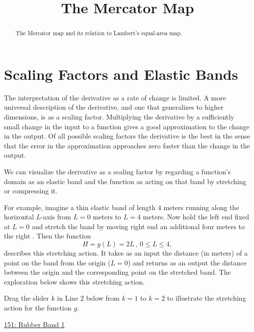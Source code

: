 \documentclass{ximera}
\title{The Mercator Map}
\begin{document}
\begin{abstract}
The Mercator map and its relation to Lambert's equal-area map.
\end{abstract}
\maketitle

\section{Scaling Factors and Elastic Bands}
The interpretation of the derivative as a rate of change is limited. A more universal description of the derivative, and one that generalizes to higher dimensions, is as a scaling factor. Multiplying the derivative by a sufficiently small change in the input to a function gives a good approximation to the change in the output. Of all possible scaling factors the derivative is the best in the sense that the error in the approximation approaches zero faster than the change in the output.

We can visualize the derivative as a scaling factor by regarding a function's domain as an elastic band and the function as acting on that band by stretching or compressing it.

For example, imagine a thin elastic band of length $4$ meters running along the horizontal $L$-axis from $L=0$ meters to $L=4$ meters.  Now hold the left end fixed at $L=0$ and stretch the band by moving right end an additional four meters to the right . Then the function
\[
      H = g(L) = 2L \, , \, 0\leq L \leq 4 ,
\]
describes this stretching action. It takes as an input the distance (in meters) of a point on the band from the origin ($L=0$) and returns as an output the distance between the origin and the corresponding point on the stretched band. The exploration below shows this stretching action.

\begin{exploration} \label{Ex:98f3rgafgbb}
Drag the slider $k$ in Line 2 below from $k=1$ to $k=2$ to illustrate the stretching action for the function $g$.

\begin{onlineOnly}
    \begin{center}
\end{center}
\end{onlineOnly}

\href{https://www.desmos.com/calculator/qejivz36ui}{151: Rubber Band 1}

\end{exploration}
\end{document}

